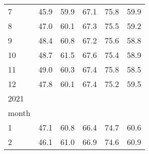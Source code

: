 \begin{tabular}{llllll}
\multicolumn{1}{l}{\hspace{3em}7} &
  \multicolumn{1}{|r}{45.9} &
  \multicolumn{1}{r}{59.9} &
  \multicolumn{1}{r}{67.1} &
  \multicolumn{1}{r}{75.8} &
  \multicolumn{1}{r}{59.9} \\
\multicolumn{1}{l}{\hspace{3em}8} &
  \multicolumn{1}{|r}{47.0} &
  \multicolumn{1}{r}{60.1} &
  \multicolumn{1}{r}{67.3} &
  \multicolumn{1}{r}{75.5} &
  \multicolumn{1}{r}{59.2} \\
\multicolumn{1}{l}{\hspace{3em}9} &
  \multicolumn{1}{|r}{48.4} &
  \multicolumn{1}{r}{60.8} &
  \multicolumn{1}{r}{67.2} &
  \multicolumn{1}{r}{75.6} &
  \multicolumn{1}{r}{58.8} \\
\multicolumn{1}{l}{\hspace{3em}10} &
  \multicolumn{1}{|r}{48.7} &
  \multicolumn{1}{r}{61.5} &
  \multicolumn{1}{r}{67.6} &
  \multicolumn{1}{r}{75.4} &
  \multicolumn{1}{r}{58.9} \\
\multicolumn{1}{l}{\hspace{3em}11} &
  \multicolumn{1}{|r}{49.0} &
  \multicolumn{1}{r}{60.3} &
  \multicolumn{1}{r}{67.4} &
  \multicolumn{1}{r}{75.8} &
  \multicolumn{1}{r}{58.5} \\
\multicolumn{1}{l}{\hspace{3em}12} &
  \multicolumn{1}{|r}{47.8} &
  \multicolumn{1}{r}{60.1} &
  \multicolumn{1}{r}{67.4} &
  \multicolumn{1}{r}{75.2} &
  \multicolumn{1}{r}{59.5} \\
\multicolumn{1}{l}{\hspace{1em}2021} &
  \multicolumn{1}{|r}{} &
  \multicolumn{1}{r}{} &
  \multicolumn{1}{r}{} &
  \multicolumn{1}{r}{} &
  \multicolumn{1}{r}{} \\
\multicolumn{1}{l}{\hspace{2em}month} &
  \multicolumn{1}{|r}{} &
  \multicolumn{1}{r}{} &
  \multicolumn{1}{r}{} &
  \multicolumn{1}{r}{} &
  \multicolumn{1}{r}{} \\
\multicolumn{1}{l}{\hspace{3em}1} &
  \multicolumn{1}{|r}{47.1} &
  \multicolumn{1}{r}{60.8} &
  \multicolumn{1}{r}{66.4} &
  \multicolumn{1}{r}{74.7} &
  \multicolumn{1}{r}{60.6} \\
\multicolumn{1}{l}{\hspace{3em}2} &
  \multicolumn{1}{|r}{46.1} &
  \multicolumn{1}{r}{61.0} &
  \multicolumn{1}{r}{66.9} &
  \multicolumn{1}{r}{74.6} &
  \multicolumn{1}{r}{60.9} \\

\end{tabular}
